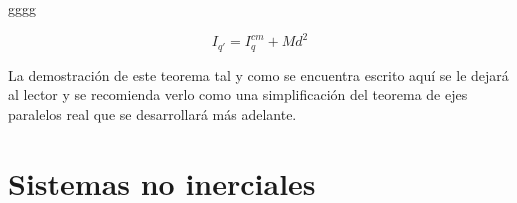 \documentclass[/home/hernan/Documentos/Apuntes_mecanica_teorica/main.tex]{subfiles}
\begin{document}
	\begin{definition}
		gggg
	\end{definition}

	\begin{theorem}
		\begin{equation}
			I_{{q}'}= I_{q}^{cm} + Md^{2}
		\end{equation}

		La demostración de este teorema tal y como se encuentra escrito aquí se le dejará al lector y se recomienda verlo como una simplificación del teorema de ejes paralelos real que se desarrollará más adelante.
	\end{theorem}
	
	\section{Sistemas no inerciales}
	\label{sec: noinerciales}
\end{document}
